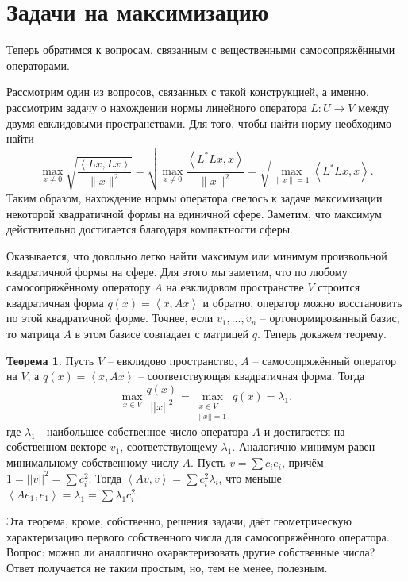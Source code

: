 \documentclass[10pt,a4paper,oneside]{book}
\theoremstyle{definition}
\newtheorem{thm}{\color{red!40!black}Теорема}
\def\lan{\left\langle }
\def\ran{\right\rangle}
\def\thrm{\begin{thm}}
\def\ethrm{\end{thm}}
\begin{document}
\section{Задачи на максимизацию}

Теперь обратимся к вопросам, связанным с вещественными самосопряжёнными операторами.

Рассмотрим один из вопросов, связанных с такой конструкцией, а именно, рассмотрим задачу о нахождении нормы линейного оператора $L \colon U \to V$ между двумя евклидовыми пространствами. Для того, чтобы найти  норму необходимо найти
$$\max_{x\neq 0}\sqrt{\frac{\lan Lx,Lx\ran}{\|x\|^2}}=\sqrt{\max_{x\neq 0}\frac{\lan L^*Lx,x\ran}{\|x\|^2}}=\sqrt{\max_{\|x\|=1} \lan L^*Lx,x\ran}.$$
Таким образом, нахождение нормы оператора свелось к задаче максимизации некоторой квадратичной формы на единичной сфере. Заметим, что максимум действительно достигается благодаря компактности сферы.

Оказывается, что довольно легко найти максимум или минимум произвольной квадратичной формы на сфере. Для этого мы заметим, что по любому самосопряжённому оператору $A$ на евклидовом пространстве $V$ строится квадратичная форма $q(x)=\lan x, Ax\ran$ и обратно, оператор можно восстановить по этой квадратичной форме. Точнее, если $v_1,\dots,v_n$ -- ортонормированный базис, то матрица $A$ в этом базисе совпадает с матрицей $q$. Теперь докажем теорему.



\thrm Пусть $V$ -- евклидово пространство, $A$ -- самосопряжённый оператор на $V$, а $q(x)=\lan x,Ax\ran$ -- соответствующая квадратичная форма. Тогда 
$$\max_{ x\in V } \frac{q(x)}{||x||^2}=\max_{\substack{ x\in V \\ ||x||=1}} q(x)=\lambda_1,$$
где $\lambda_1$ - наибольшее собственное число оператора $A$ и достигается на собственном векторе $v_1$, соответствующему $\lambda_1$. Аналогично минимум равен минимальному собственному числу $A$. 
\proof
Пусть $v=\sum c_i e_i$, причём $1=||v||^2=\sum c_i^2$. Тогда $\lan Av,v\ran = \sum c^2_i \lambda_i $, что меньше $\lan A e_1,e_1\ran= \lambda_1= \sum \lambda_1 c_i^2$.
\endproof
\ethrm

Эта теорема, кроме, собственно, решения задачи, даёт геометрическую характеризацию первого собственного числа для самосопряжённого оператора. Вопрос: можно ли аналогично охарактеризовать другие собственные числа? Ответ получается не таким простым, но, тем не менее, полезным.
\end{document}
